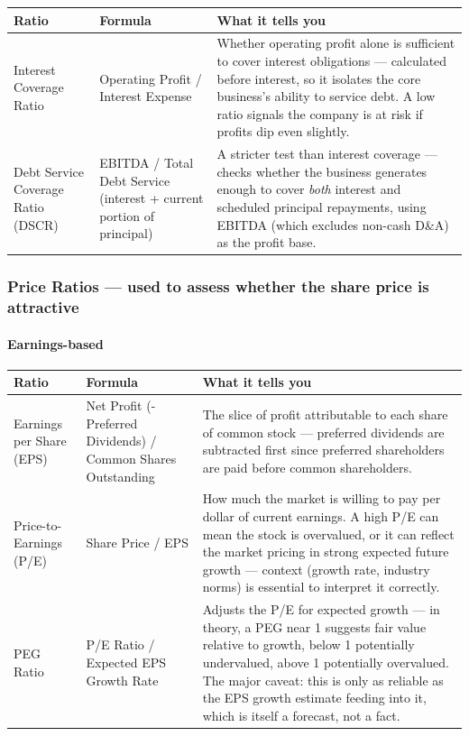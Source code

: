 \documentclass[12pt,openany]{book}
\begin{document}
\begingroup
\small
\setlength{\tabcolsep}{4pt}
\begin{center}\begin{tabular}{|L{0.22\textwidth}|L{0.24\textwidth}|L{0.42\textwidth}|}
\hline
\textbf{Ratio} & \textbf{Formula} & \textbf{What it tells you} \\
\hline
Interest Coverage Ratio & Operating Profit / Interest Expense & Whether operating profit alone is sufficient to cover interest obligations --- calculated before interest, so it isolates the core business's ability to service debt. A low ratio signals the company is at risk if profits dip even slightly. \\
\hline
Debt Service Coverage Ratio (DSCR) & EBITDA / Total Debt Service (interest + current portion of principal) & A stricter test than interest coverage --- checks whether the business generates enough to cover \emph{both} interest and scheduled principal repayments, using EBITDA (which excludes non-cash D\&A) as the profit base. \\
\hline
\end{tabular}\end{center}
\endgroup

\subsubsection{Price Ratios --- used to assess whether the share price is attractive}

\paragraph{Earnings-based} 

\begingroup
\small
\setlength{\tabcolsep}{4pt}
\begin{center}\begin{tabular}{|L{0.22\textwidth}|L{0.24\textwidth}|L{0.42\textwidth}|}
\hline
\textbf{Ratio} & \textbf{Formula} & \textbf{What it tells you} \\
\hline
Earnings per Share (EPS) & Net Profit (- Preferred Dividends) / Common Shares Outstanding & The slice of profit attributable to each share of common stock --- preferred dividends are subtracted first since preferred shareholders are paid before common shareholders. \\
\hline
Price-to-Earnings (P/E) & Share Price / EPS & How much the market is willing to pay per dollar of current earnings. A high P/E can mean the stock is overvalued, or it can reflect the market pricing in strong expected future growth --- context (growth rate, industry norms) is essential to interpret it correctly. \\
\hline
PEG Ratio & P/E Ratio / Expected EPS Growth Rate & Adjusts the P/E for expected growth --- in theory, a PEG near 1 suggests fair value relative to growth, below 1 potentially undervalued, above 1 potentially overvalued. The major caveat: this is only as reliable as the EPS growth estimate feeding into it, which is itself a forecast, not a fact. \\
\hline
\end{tabular}\end{center}
\endgroup
\end{document}
